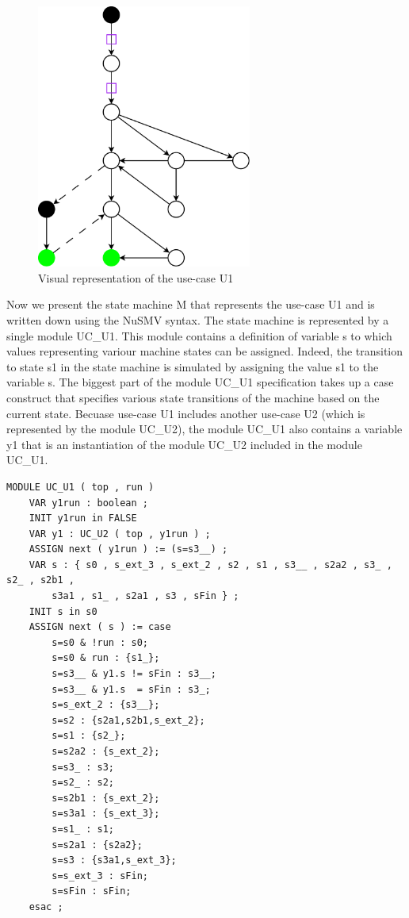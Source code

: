 \begin{figure}[h]
  \centering
  \includegraphics[width=200pt]{images/u1}
  \caption{Visual representation of the use-case U1}
  \label{fig:use-case U1}
\end{figure}

Now we present the state machine M that represents the use-case U1 and is written down using the NuSMV syntax. The state machine is
represented by a single module UC\_U1. This module contains a definition of variable s to which values representing variour machine
states can be assigned. Indeed, the transition to state s1 in the state machine is simulated by assigning the value s1 to the
variable s. The biggest part of the module UC\_U1 specification takes up a case construct that specifies various state transitions
of the machine based on the current state. Becuase use-case U1 includes another use-case U2 (which is represented by the module
UC\_U2), the module UC\_U1 also contains a variable y1 that is an instantiation of the module UC\_U2 included in the module UC\_U1.
\begin{lstlisting}
MODULE UC_U1 ( top , run )
	VAR y1run : boolean ;
	INIT y1run in FALSE
	VAR y1 : UC_U2 ( top , y1run ) ;
	ASSIGN next ( y1run ) := (s=s3__) ;
	VAR s : { s0 , s_ext_3 , s_ext_2 , s2 , s1 , s3__ , s2a2 , s3_ , s2_ , s2b1 ,
		s3a1 , s1_ , s2a1 , s3 , sFin } ;
	INIT s in s0
	ASSIGN next ( s ) := case
		s=s0 & !run : s0;
		s=s0 & run : {s1_};
		s=s3__ & y1.s != sFin : s3__;
		s=s3__ & y1.s  = sFin : s3_;
		s=s_ext_2 : {s3__};
		s=s2 : {s2a1,s2b1,s_ext_2};
		s=s1 : {s2_};
		s=s2a2 : {s_ext_2};
		s=s3_ : s3;
		s=s2_ : s2;
		s=s2b1 : {s_ext_2};
		s=s3a1 : {s_ext_3};
		s=s1_ : s1;
		s=s2a1 : {s2a2};
		s=s3 : {s3a1,s_ext_3};
		s=s_ext_3 : sFin;
		s=sFin : sFin;
	esac ;
\end{lstlisting}

